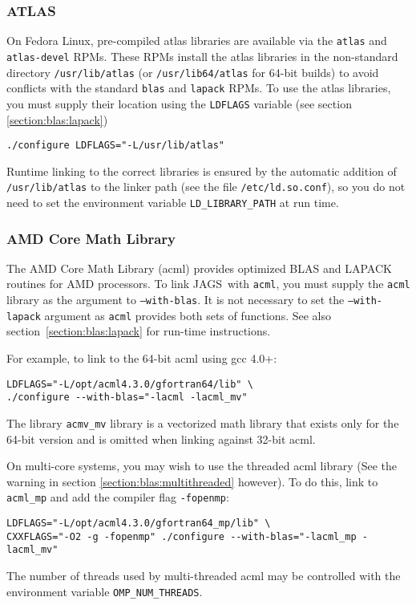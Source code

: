 \documentclass[11pt, a4paper, titlepage]{article}
\newcommand{\JAGS}{\textsf{JAGS}}
\begin{document}
\subsubsection{ATLAS}

On Fedora Linux, pre-compiled atlas libraries are available via the
\texttt{atlas} and \texttt{atlas-devel} RPMs.  These RPMs install the
atlas libraries in the non-standard directory \texttt{/usr/lib/atlas}
(or \texttt{/usr/lib64/atlas} for 64-bit builds) to avoid conflicts
with the standard \texttt{blas} and \texttt{lapack} RPMs. To use the
atlas libraries, you must supply their location using the
\verb+LDFLAGS+ variable (see section \ref{section:blas:lapack})
\begin{verbatim}
./configure LDFLAGS="-L/usr/lib/atlas"
\end{verbatim}
Runtime linking to the correct libraries is ensured by the automatic
addition of \texttt{/usr/lib/atlas} to the linker path (see the file
\texttt{/etc/ld.so.conf}), so you do not need to set the
environment variable \verb+LD_LIBRARY_PATH+ at run time.

\subsubsection{AMD Core Math Library}
\label{section:acml:linux}

The AMD Core Math Library (acml) provides optimized BLAS and LAPACK
routines for AMD processors. To link \JAGS\ with \texttt{acml}, you must
supply the \texttt{acml} library as the argument to \texttt{--with-blas}.
It is not necessary to set the \texttt{--with-lapack} argument
as \texttt{acml} provides both sets of functions. See also
section~\ref{section:blas:lapack} for run-time instructions.

For example, to link to the 64-bit acml using gcc 4.0+:
\begin{verbatim}
LDFLAGS="-L/opt/acml4.3.0/gfortran64/lib" \
./configure --with-blas="-lacml -lacml_mv" 
\end{verbatim}
The library \verb+acmv_mv+ library is a vectorized math library that
exists only for the 64-bit version and is omitted when linking against
32-bit acml.

On multi-core systems, you may wish to use the threaded acml library
(See the warning in section \ref{section:blas:multithreaded} however).
To do this, link to \verb+acml_mp+ and add the compiler flag
\verb+-fopenmp+:
\begin{verbatim}
LDFLAGS="-L/opt/acml4.3.0/gfortran64_mp/lib" \
CXXFLAGS="-O2 -g -fopenmp" ./configure --with-blas="-lacml_mp -lacml_mv" 
\end{verbatim}
The number of threads used by multi-threaded acml may be controlled
with the environment variable \verb+OMP_NUM_THREADS+.
\end{document}
